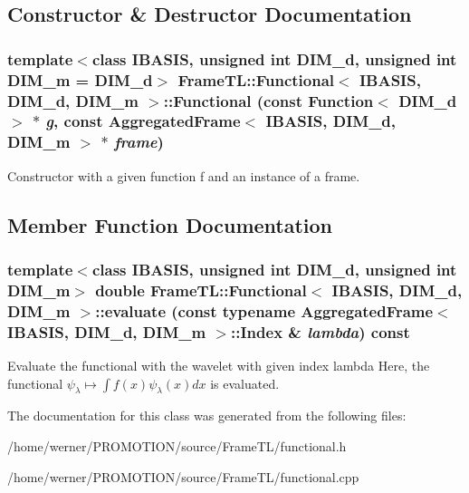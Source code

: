 \subsection{Constructor \& Destructor Documentation}
\hypertarget{classFrameTL_1_1Functional_83bf7391168b379d55c45f09f9e18dfb}{
\subsubsection[{Functional}]{\setlength{\rightskip}{0pt plus 5cm}template$<$class IBASIS, unsigned int DIM\_\-d, unsigned int DIM\_\-m = DIM\_\-d$>$ {\bf FrameTL::Functional}$<$ IBASIS, DIM\_\-d, DIM\_\-m $>$::{\bf Functional} (const Function$<$ DIM\_\-d $>$ $\ast$ {\em g}, \/  const {\bf AggregatedFrame}$<$ IBASIS, DIM\_\-d, DIM\_\-m $>$ $\ast$ {\em frame})}}
\label{classFrameTL_1_1Functional_83bf7391168b379d55c45f09f9e18dfb}


Constructor with a given function f and an instance of a frame. 

\subsection{Member Function Documentation}
\hypertarget{classFrameTL_1_1Functional_e1cb262dd592892e2fbc616dbf370605}{
\subsubsection[{evaluate}]{\setlength{\rightskip}{0pt plus 5cm}template$<$class IBASIS, unsigned int DIM\_\-d, unsigned int DIM\_\-m$>$ double {\bf FrameTL::Functional}$<$ IBASIS, DIM\_\-d, DIM\_\-m $>$::evaluate (const typename {\bf AggregatedFrame}$<$ IBASIS, DIM\_\-d, DIM\_\-m $>$::Index \& {\em lambda}) const}}
\label{classFrameTL_1_1Functional_e1cb262dd592892e2fbc616dbf370605}


Evaluate the functional with the wavelet with given index lambda Here, the functional $\psi_\lambda \mapsto \int f(x) \psi_\lambda(x) dx$ is evaluated. 

The documentation for this class was generated from the following files:\begin{CompactItemize}
\item 
/home/werner/PROMOTION/source/FrameTL/functional.h\item 
/home/werner/PROMOTION/source/FrameTL/functional.cpp\end{CompactItemize}
